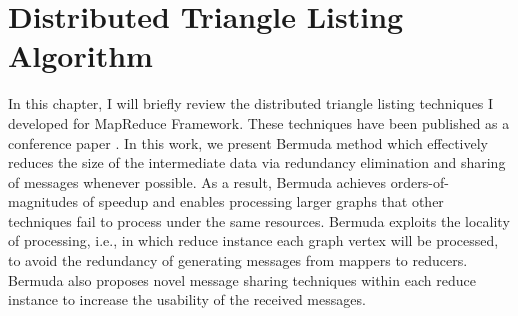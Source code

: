 \chapter{Distributed Triangle Listing Algorithm}
\label{chp:bec}
In this chapter, I will briefly review the distributed triangle listing techniques I developed for MapReduce Framework. These techniques have been published as a conference paper \cite{bermuda}. In this work, we present Bermuda method which effectively reduces the size of the intermediate data via redundancy elimination and sharing of messages whenever possible. As a result, Bermuda achieves orders-of-magnitudes of speedup and enables processing larger graphs that other techniques fail to process under the same resources. Bermuda exploits the locality of processing, i.e.,  in which reduce instance each graph vertex will be processed, to avoid the redundancy of generating messages from mappers to reducers. Bermuda also proposes novel message sharing techniques within each reduce instance to increase the usability of the received messages. 



